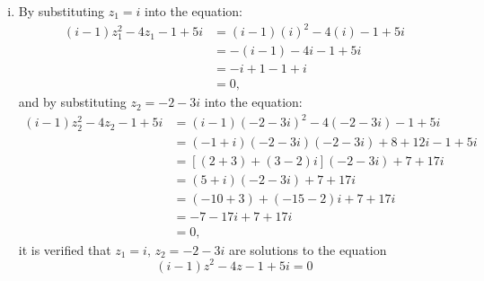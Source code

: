 \documentclass[a4paper, titlepage, DIV=14]{scrartcl}
\begin{document}
\begin{enumerate}
\begin{enumerate}[i)]
            \item By substituting $z_{1}=i$ into the equation:
            \begin{align*}
                (i-1)z_{1}^{2}-4z_{1}-1+5i &= (i-1)(i)^{2}-4(i)-1+5i \\
                                        &= -(i-1) - 4i - 1 + 5i \\
                                        &= -i+1 -1 + i \\
                                        &= 0,
            \end{align*}
            and by substituting $z_{2}=-2-3i$ into the equation:
            \begin{align*}
                (i-1)z_{2}^{2}-4z_{2}-1+5i &= (i-1)(-2-3i)^{2}-4(-2-3i)-1+5i \\
                        &= (-1+i)(-2-3i)(-2-3i) + 8 + 12i - 1 + 5i \\
                        &= [(2+3)+(3-2)i](-2-3i) + 7 + 17i \\
                        &= (5+i)(-2-3i)+7+17i \\
                        &= (-10+3) + (-15-2)i + 7 + 17i \\
                        &= -7 - 17i + 7 + 17i \\
                        &= 0,
            \end{align*} it is verified that $z_{1}=i, \, z_{2}=-2-3i$ are solutions to 
            the equation 
            \begin{equation*}
                (i-1)z^{2}-4z-1+5i=0 
            \end{equation*}
        \end{enumerate} 


\end{enumerate}
\end{document}
